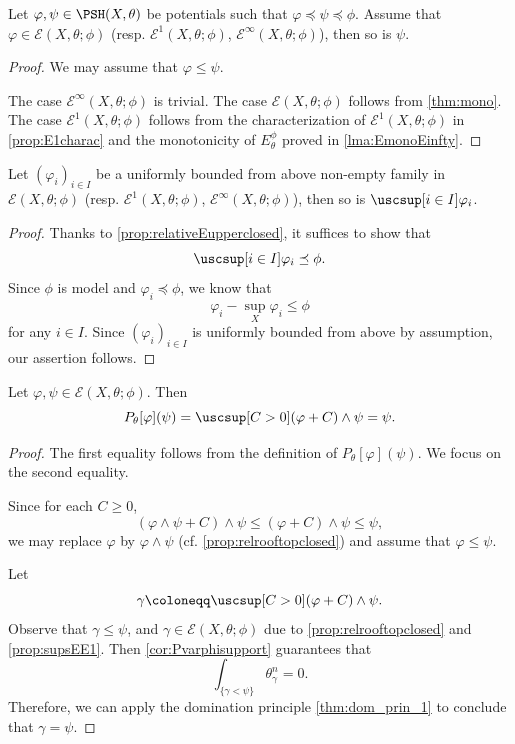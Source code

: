 \begin{proposition}\label{prop:relativeEupperclosed}
    Let $\varphi,\psi\in \PSH(X,\theta)$ be potentials such that $\varphi\preceq \psi \preceq \phi$. Assume that $\varphi\in \mathcal{E}(X,\theta;\phi)$ (resp. $\mathcal{E}^1(X,\theta;\phi)$, $\mathcal{E}^{\infty}(X,\theta;\phi)$), then so is $\psi$.
\end{proposition}
\begin{proof}
    We may assume that $\varphi\leq \psi$.

    The case $\mathcal{E}^{\infty}(X,\theta;\phi)$ is trivial. The case $\mathcal{E}(X,\theta;\phi)$ follows from \cref{thm:mono}. The case $\mathcal{E}^1(X,\theta;\phi)$ follows from the characterization of $\mathcal{E}^1(X,\theta;\phi)$ in \cref{prop:E1charac} and the monotonicity of $E_{\theta}^{\phi}$ proved in \cref{lma:EmonoEinfty}.
\end{proof}

\begin{proposition}\label{prop:supsEE1}
    Let $(\varphi_i)_{i\in I}$ be a uniformly bounded from above non-empty family in $\mathcal{E}(X,\theta;\phi)$ (resp. $\mathcal{E}^1(X,\theta;\phi)$, $\mathcal{E}^{\infty}(X,\theta;\phi)$), then so is $\uscsup[i\in I]\varphi_i$.
\end{proposition}
\begin{proof}
Thanks to \cref{prop:relativeEupperclosed}, it suffices to show that
\[
\uscsup[i\in I]\varphi_i\preceq \phi.
\]
Since $\phi$ is model and $\varphi_i\preceq \phi$, we know that
\[
\varphi_i-\sup_X \varphi_i \leq \phi
\]
for any $i\in I$.
Since $(\varphi_i)_{i\in I}$ is uniformly bounded from above by assumption, our assertion follows.
\end{proof}




\begin{proposition}\label{prop:envrelfullmass}
    Let $\varphi,\psi\in \mathcal{E}(X,\theta;\phi)$. Then
    \[
        P_{\theta}[\varphi](\psi)=\uscsup[C > 0] (\varphi+C)\land \psi=\psi.
    \]
\end{proposition}
\begin{proof}
    The first equality follows from the definition of $P_{\theta}[\varphi](\psi)$. We focus on the second equality.

    Since for each $C\geq 0$,
    \[
        (\varphi\land \psi+C)\land \psi\leq (\varphi+C)\land \psi\leq \psi,
    \]
    we may replace $\varphi$ by $\varphi\land \psi$ (cf. \cref{prop:relrooftopclosed}) and assume that $\varphi\leq \psi$.

    Let
    \[
        \gamma\coloneqq \uscsup[C > 0] (\varphi+C)\land \psi.
    \]
    Observe that $\gamma\leq \psi$, and $\gamma\in \mathcal{E}(X,\theta;\phi)$ due to \cref{prop:relrooftopclosed} and \cref{prop:supsEE1}.
    Then \cref{cor:Pvarphisupport} guarantees that
    \[
    \int_{\{\gamma<\psi\} } \theta_{\gamma}^n=0.
    \]
    Therefore, we can apply the domination principle \cref{thm:dom_prin_1} to conclude that $\gamma=\psi$.
\end{proof}


